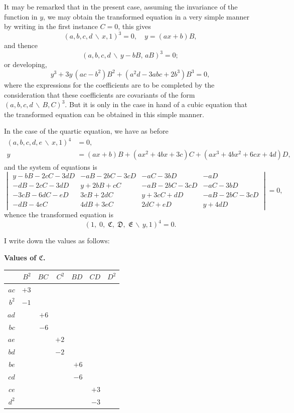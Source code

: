 \documentclass[11pt,a4paper]{article}
\theoremstyle{definition}
\begin{document}
\newpage

It may be remarked that in the present case, assuming the invariance of the function
in $y$, we may obtain the transformed equation in a very simple manner by writing in the
first instance $C=0$, this gives
\[(a,b,c,d\,\backslash\!\!\,x,1)^{3} = 0, \quad y = (ax+b)B,\]
and thence
\[(a,b,c,d\,\backslash\!\!\,y-bB,\, aB)^{3} = 0;\]
or developing,
\[y^{3} + 3y\,(ac-b^{2})B^{2} + (a^{2}d-3abc+2b^{3})B^{3} = 0,\]
where the expressions for the coefficients are to be completed by the consideration that
these coefficients are covariants of the form $(a,b,c,d\,\backslash\!\!\,B,C)^{3}$. But it is only in
the case in hand of a cubic equation that the transformed equation can be obtained in
this simple manner.

In the case of the quartic equation, we have as before
\begin{align*}
(a,b,c,d,e\,\backslash\!\!\,x,1)^{4} &= 0,\\
y &= (ax+b)B + (ax^{2}+4bx+3c)C + (ax^{3}+4bx^{2}+6cx+4d)D,
\end{align*}
and the system of equations is
\[
\begin{vmatrix}
y-bB-2cC-3dD & -aB-2bC-3cD & -aC-3bD & -aD \\
-dB-2cC-3dD & y+2bB+cC & -aB-2bC-3cD & -aC-3bD \\
-3cB-6dC-eD & 3cB+2dC & y+3cC+dD & -aB-2bC-3cD \\
-dB-4eC & 4dB+3eC & 2dC+eD & y+4dD
\end{vmatrix}
= 0,
\]
whence the transformed equation is
\[(1,\; 0,\; \mathfrak{C},\; \mathfrak{D},\; \mathfrak{E}\,\backslash\!\!\,y,1)^{4} = 0.\]

I write down the values as follows:

\begin{center}
\renewcommand{\arraystretch}{1.2}
\textbf{Values of $\mathfrak{C}$.}
\begin{tabular}{r|rrrrrr}
& $B^{2}$ & $BC$ & $C^{2}$ & $BD$ & $CD$ & $D^{2}$ \\
\hline
$ac$ & $+3$ \\
$b^{2}$ & $-1$ \\
$ad$ & & $+6$ \\
$bc$ & & $-6$ \\
$ae$ & & & $+2$ \\
$bd$ & & & $-2$ \\
$be$ & & & & $+6$ \\
$cd$ & & & & $-6$ \\
$ce$ & & & & & $+3$ \\
$d^{2}$ & & & & & $-3$
\end{tabular}
\end{center}
\end{document}
